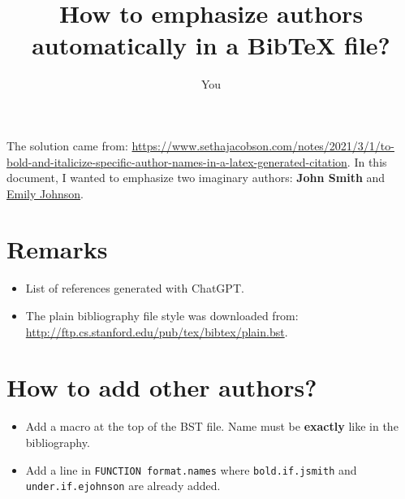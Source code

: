 \documentclass{article}
\title{How to emphasize authors automatically in a BibTeX file?}
\author{You}
\date{}
\begin{document}
\maketitle
The solution came from: \url{https://www.sethajacobson.com/notes/2021/3/1/to-bold-and-italicize-specific-author-names-in-a-latex-generated-citation}. In this document, I wanted to emphasize two imaginary authors: \textbf{John Smith} and \underline{Emily Johnson}.
\section*{Remarks}
\begin{itemize}
    \item List of references generated with ChatGPT.
    \item The plain bibliography file style was downloaded from: \url{http://ftp.cs.stanford.edu/pub/tex/bibtex/plain.bst}.
\end{itemize}

\section*{How to add other authors?}
\begin{itemize}
    \item Add a macro at the top of the BST file. Name must be \textbf{exactly} like in the bibliography.
    \item Add a line in \texttt{FUNCTION {format.names}} where \texttt{bold.if.jsmith} and \texttt{under.if.ejohnson} are already added.
\end{itemize}

\nocite{*}



\end{document}
